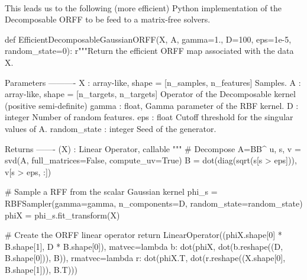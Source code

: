 \documentclass[twoside,11pt]{article}
\begin{document}
\paragraph{}
This leads us to the following (more efficient) Python implementation of the
Decomposable \acs{ORFF}  to be feed to a matrix-free solvers.
\begin{pyblock}
def EfficientDecomposableGaussianORFF(X, A, gamma=1.,
                                      D=100, eps=1e-5, random_state=0):
    r"""Return the efficient ORFF map associated with the data X.

    Parameters
    ----------
    X : {array-like}, shape = [n_samples, n_features]
        Samples.
    A : {array-like}, shape = [n_targets, n_targets]
        Operator of the Decomposable kernel (positive semi-definite)
    gamma : {float},
        Gamma parameter of the RBF kernel.
    D : {integer}
        Number of random features.
    eps : {float}
        Cutoff threshold for the singular values of A.
    random_state : {integer}
        Seed of the generator.

    Returns
    -------
    \tilde{\Phi}(X) : Linear Operator, callable
    """
    # Decompose A=BB^\transpose
    u, s, v = svd(A, full_matrices=False, compute_uv=True)
    B = dot(diag(sqrt(s[s > eps])), v[s > eps, :])

    # Sample a RFF from the scalar Gaussian kernel
    phi_s = RBFSampler(gamma=gamma, n_components=D, random_state=random_state)
    phiX = phi_s.fit_transform(X)

    # Create the ORFF linear operator
    return LinearOperator((phiX.shape[0] * B.shape[1], D * B.shape[0]),
                          matvec=lambda b: dot(phiX, dot(b.reshape((D, B.shape[0])), B)),
                          rmatvec=lambda r: dot(phiX.T, dot(r.reshape((X.shape[0], B.shape[1])), B.T)))
\end{pyblock}
\end{document}
